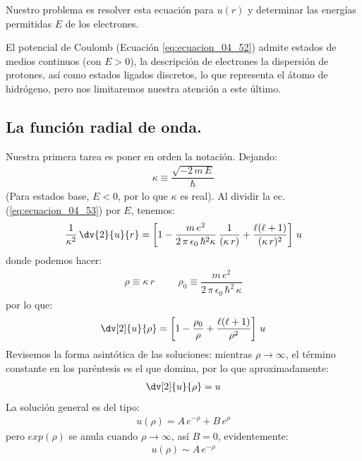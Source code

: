 Nuestro problema es resolver esta ecuación para $u(r)$ y determinar las energías permitidas $E$ de los electrones. 
\par
El potencial de Coulomb (Ecuación \ref{eq:ecuacion_04_52}) admite estados de medios continuos (con $E > 0$), la descripción de electrones la dispersión de protones, así como estados ligados discretos, lo que representa el átomo de hidrógeno, pero nos limitaremos nuestra atención a este último.

\subsection{La función radial de onda.}

Nuestra primera tarea es poner en orden la notación. Dejando:
\begin{align}
\kappa \equiv \dfrac{\sqrt{-2 \, m \, E}}{\hbar}
\label{eq:ecuacion_04_54}
\end{align}
(Para estados base, $E < 0$, por lo que $\kappa$ es real). Al dividir la ec. (\ref{eq:ecuacion_04_53}) por $E$, tenemos:
\begin{align*}
\dfrac{1}{\kappa^{2}} \, \dv{2}{u}{r} = \left[1 - \dfrac{m \, e^{2}}{2 \, \pi \, \epsilon_{0} \,\hbar^{2} \kappa} \, \dfrac{1}{(\kappa \, r)} + \dfrac{\ell (\ell + 1)}{(\kappa \, r)^{2}} \right] \, u
\end{align*}
donde podemos hacer:
\begin{align}
\rho \equiv \kappa \, r \hspace{1cm} \rho_{0} \equiv \dfrac{m \, e^{2}}{2 \, \pi \, \epsilon_{0} \, \hbar^{2} \, \kappa}
\label{eq:ecuacion_04_55}
\end{align}
por lo que:
\begin{align}
\dv[2]{u}{\rho} = \left[ 1 - \dfrac{\rho_{0}}{\rho} + \dfrac{\ell (\ell + 1)}{\rho^{2}} \right] \, u
\label{eq:ecuacion_04_56}
\end{align}
Revisemos la forma asintótica de las soluciones: mientras $\rho \to \infty$, el término constante en los paréntesis es el que domina, por lo que aproximadamente:
\begin{align*}
\dv[2]{u}{\rho} = u
\end{align*}
La solución general es del tipo:
\begin{align}
u(\rho) = A \, e^{-\rho} + B \, e^{\rho}
\label{eq:ecuacion_04_57}
\end{align}
pero $exp(\rho)$ se anula cuando $\rho \to \infty$, así $B = 0$, evidentemente:
\begin{align}
u(\rho) \sim A \, e^{-\rho}
\label{eq:ecuacion_04_58}
\end{align}
